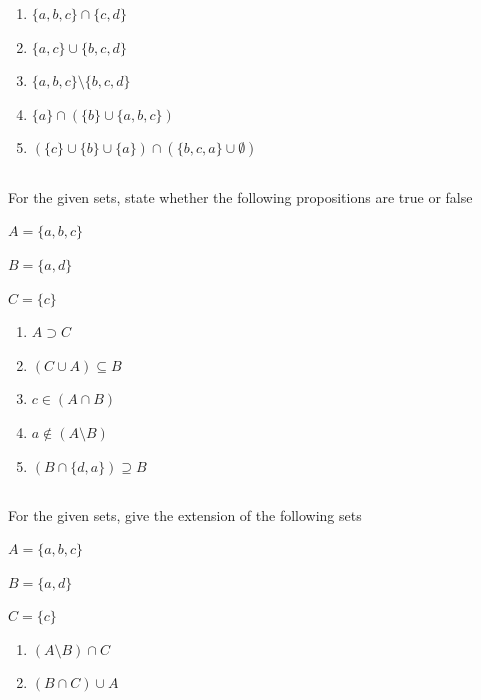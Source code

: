 \documentclass[twocolumn]{article}
\begin{document}
    \begin{enumerate}
        \item $\{ a, b, c \} \cap \{ c, d \} $
        \item $\{ a, c \} \cup \{ b, c, d \} $
        \item $\{ a, b, c \} \setminus \{ b, c, d \} $
        \item $\{ a \} \cap ( \{ b \} \cup \{a, b, c\} ) $
        \item $ (\{ c \} \cup \{ b \} \cup \{a\}) \cap ( \{b, c, a\} \cup \emptyset ) $
    \end{enumerate}

\subsection{}

    For the given sets, state whether the following propositions are true or false

    $ A = \{ a, b, c \} $

    $ B = \{ a, d \} $

    $ C = \{ c \} $

    \begin{enumerate}
        \item $ A \supset C $
        \item $ (C \cup A) \subseteq B $
        \item $ c \in ( A \cap B ) $
        \item $ a \not \in ( A \setminus B ) $
        \item $(B \cap \{d, a\} ) \supseteq B$
    \end{enumerate}

\subsection{}

    For the given sets, give the extension of the following sets

    $ A = \{ a, b, c \} $

    $ B = \{ a, d \} $

    $ C = \{ c \} $

    \begin{enumerate}
        \item $ (A \setminus B) \cap C$
        \item $ ( B \cap C ) \cup A $
    \end{enumerate}


\subsection{}
\end{document}
